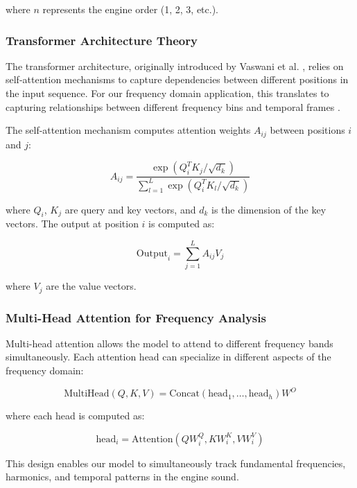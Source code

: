 \documentclass[journal,10pt]{IEEEtran}
\begin{document}
where $n$ represents the engine order (1, 2, 3, etc.).

\subsubsection{Transformer Architecture Theory}

The transformer architecture, originally introduced by Vaswani et al. \cite{transformer}, relies on self-attention mechanisms to capture dependencies between different positions in the input sequence. For our frequency domain application, this translates to capturing relationships between different frequency bins and temporal frames \cite{audio_transformer}.

The self-attention mechanism computes attention weights $A_{ij}$ between positions $i$ and $j$:

\begin{equation}
A_{ij} = \frac{\exp(Q_i^T K_j / \sqrt{d_k})}{\sum_{l=1}^{L} \exp(Q_i^T K_l / \sqrt{d_k})}
\end{equation}

where $Q_i$, $K_j$ are query and key vectors, and $d_k$ is the dimension of the key vectors. The output at position $i$ is computed as:

\begin{equation}
\text{Output}_i = \sum_{j=1}^{L} A_{ij} V_j
\end{equation}

where $V_j$ are the value vectors.

\subsubsection{Multi-Head Attention for Frequency Analysis}

Multi-head attention allows the model to attend to different frequency bands simultaneously. Each attention head can specialize in different aspects of the frequency domain:

\begin{equation}
\text{MultiHead}(Q, K, V) = \text{Concat}(\text{head}_1, \ldots, \text{head}_h)W^O
\end{equation}

where each head is computed as:

\begin{equation}
\text{head}_i = \text{Attention}(QW_i^Q, KW_i^K, VW_i^V)
\end{equation}

This design enables our model to simultaneously track fundamental frequencies, harmonics, and temporal patterns in the engine sound.
\end{document}
